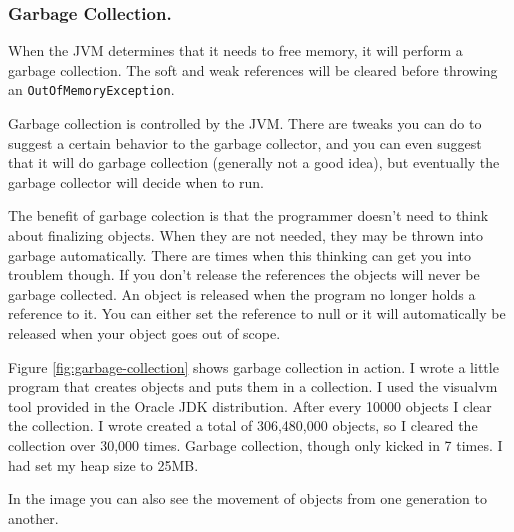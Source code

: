 \subsubsection{Garbage Collection.}
When the JVM determines that it needs to free memory, it will perform a garbage collection. The soft and weak references will be cleared before throwing an \texttt{OutOfMemoryException}. 

Garbage collection is controlled by the JVM. There are tweaks you can do to suggest a certain behavior to the garbage collector, and you can even suggest that it will do garbage collection (generally not a good idea), but eventually the garbage collector will decide when to run.

The benefit of garbage colection is that the programmer doesn't need to think about finalizing objects. When they are not needed, they may be thrown into garbage automatically. There are times when this thinking can get you into troublem though. If you don't release the references the objects will never be garbage collected. An object is released when the program no longer holds a reference to it. You can either set the reference to null or it will automatically be released when your object goes out of scope.

Figure \ref{fig:garbage-collection} shows garbage collection in action. I wrote a little program that creates objects and puts them in a collection. I used the visualvm tool provided in the Oracle JDK distribution\cite{garbagecollection}. After every 10000 objects I clear the collection. I wrote created a total of 306,480,000 objects, so I cleared the collection over 30,000 times. Garbage collection, though only kicked in 7 times. I had set my heap size to 25MB. 

In the image you can also see the movement of objects from one generation to another.
